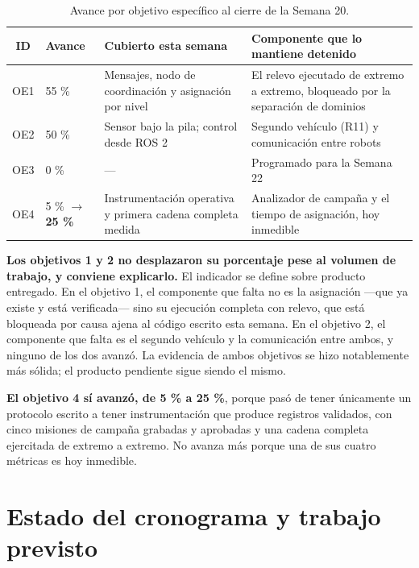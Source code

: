 \documentclass[12pt,letterpaper]{article}
\begin{document}
\begin{table}[H]
    \centering
    \small
    \caption{Avance por objetivo específico al cierre de la Semana 20.}
    \label{tab:objetivos}
    \begin{tabular}{@{}cp{2.6cm}p{4.2cm}p{4.8cm}@{}}
        \toprule
        \textbf{ID} & \textbf{Avance} & \textbf{Cubierto esta semana} & \textbf{Componente que lo mantiene detenido} \\ \midrule
        OE1 & 55 \% & Mensajes, nodo de coordinación y asignación por nivel & El relevo ejecutado de extremo a extremo, bloqueado por la separación de dominios \\ \addlinespace
        OE2 & 50 \% & Sensor bajo la pila; control desde ROS 2 & Segundo vehículo (R11) y comunicación entre robots \\ \addlinespace
        OE3 & 0 \% & --- & Programado para la Semana 22 \\ \addlinespace
        OE4 & 5 \% $\rightarrow$ \textbf{25 \%} & Instrumentación operativa y primera cadena completa medida & Analizador de campaña y el tiempo de asignación, hoy inmedible \\ \bottomrule
    \end{tabular}
\end{table}

\textbf{Los objetivos 1 y 2 no desplazaron su porcentaje pese al volumen de trabajo, y conviene explicarlo.} El indicador se define sobre producto entregado. En el objetivo 1, el componente que falta no es la asignación ---que ya existe y está verificada--- sino su ejecución completa con relevo, que está bloqueada por causa ajena al código escrito esta semana. En el objetivo 2, el componente que falta es el segundo vehículo y la comunicación entre ambos, y ninguno de los dos avanzó. La evidencia de ambos objetivos se hizo notablemente más sólida; el producto pendiente sigue siendo el mismo.

\textbf{El objetivo 4 sí avanzó, de 5 \% a 25 \%}, porque pasó de tener únicamente un protocolo escrito a tener instrumentación que produce registros validados, con cinco misiones de campaña grabadas y aprobadas y una cadena completa ejercitada de extremo a extremo. No avanza más porque una de sus cuatro métricas es hoy inmedible.

\section{Estado del cronograma y trabajo previsto}
\label{sec:cronograma}
\end{document}

